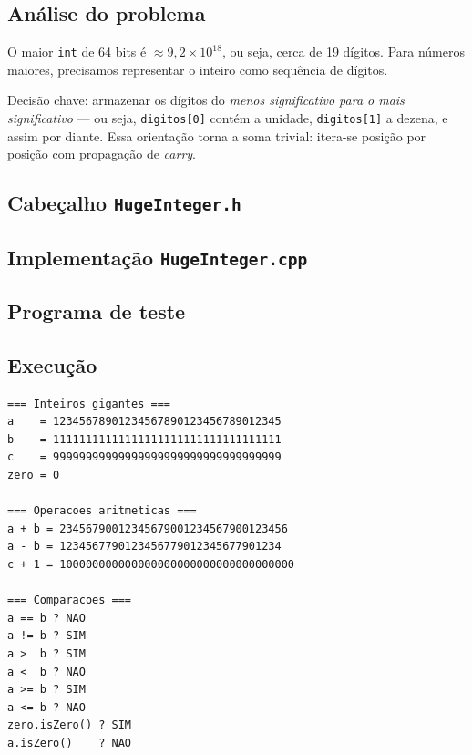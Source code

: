 \documentclass[11pt,a4paper]{article}
\begin{document}
\subsection*{An\'alise do problema}

O maior \texttt{int} de 64 bits \'e $\approx 9{,}2 \times 10^{18}$, ou seja, cerca de 19 d\'igitos. Para n\'umeros maiores, precisamos representar o inteiro como sequ\^encia de d\'igitos.

Decis\~ao chave: armazenar os d\'igitos do \emph{menos significativo para o mais significativo} --- ou seja, \texttt{digitos[0]} cont\'em a unidade, \texttt{digitos[1]} a dezena, e assim por diante. Essa orienta\c{c}\~ao torna a soma trivial: itera-se posi\c{c}\~ao por posi\c{c}\~ao com propaga\c{c}\~ao de \emph{carry}.

\subsection*{Cabe\c{c}alho \texttt{HugeInteger.h}}



\subsection*{Implementa\c{c}\~ao \texttt{HugeInteger.cpp}}



\subsection*{Programa de teste}



\subsection*{Execu\c{c}\~ao}

\begin{saidabox}
\begin{lstlisting}[style=terminal]
=== Inteiros gigantes ===
a    = 12345678901234567890123456789012345
b    = 11111111111111111111111111111111111
c    = 99999999999999999999999999999999999
zero = 0

=== Operacoes aritmeticas ===
a + b = 23456790012345679001234567900123456
a - b = 1234567790123456779012345677901234
c + 1 = 100000000000000000000000000000000000

=== Comparacoes ===
a == b ? NAO
a != b ? SIM
a >  b ? SIM
a <  b ? NAO
a >= b ? SIM
a <= b ? NAO
zero.isZero() ? SIM
a.isZero()    ? NAO
\end{lstlisting}
\end{saidabox}
\end{document}
